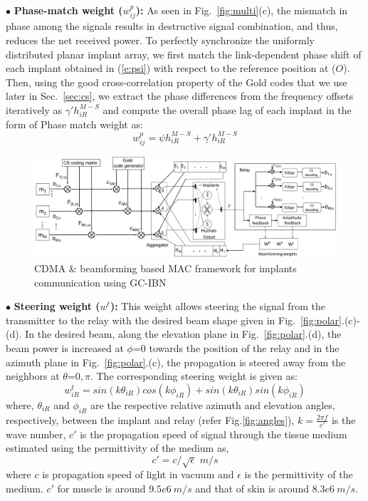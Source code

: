 \noindent$\bullet$ \textbf{Phase-match weight ($w_{ij}^p$):} As seen in Fig.~\ref{fig:multi}(c), the mismatch in phase among the signals results in destructive signal combination, and thus, reduces the net received power. To perfectly synchronize the uniformly distributed planar implant array, we first match the link-dependent phase shift of each implant obtained in (\ref{e:psi}) with respect to the reference position at ($O$). Then, using the good cross-correlation property of the Gold codes that we use later in Sec.~\ref{sec:cs}, we extract the phase differences from the frequency offsets iteratively as $\gamma' h_{iR}^{M-S}$ and compute the overall phase lag of each implant in the form of Phase match weight as: 
\begin{equation}\label{e:wp}
w_{ij}^p=\psi h_{iR}^{M-S}+\gamma' h_{iR}^{M-S} 
\end{equation}

 \begin{figure}[t]
	\centering
	\includegraphics[width=17cm]{figures/GC_beamforming/blockDiag.pdf} 
	\caption{\label{fig:spreading} CDMA \& beamforming based MAC framework for implants communication using GC-IBN}
\end{figure}

\noindent$\bullet$ \textbf{Steering weight ($w^t$):}
This weight allows steering the signal from the transmitter to the relay with the desired beam shape given in Fig.~\ref{fig:polar}.(c)-(d). In the desired beam, along the elevation plane in Fig.~\ref{fig:polar}.(d), the beam power is increased at $\phi$=$0$ towards the position of the relay and in the azimuth plane in Fig.~\ref{fig:polar}.(c), the propagation is steered away from the neighbors at $\theta$=$0,\pi$. The corresponding steering weight is given as: 
\begin{equation} \label{e:wt}
w^{t}_{iR}= sin(k\theta_{iR})cos(k\phi_{iR})+sin(k\theta_{iR})sin(k\phi_{iR})
\end{equation}
where, $\theta_{iR}$ and $\phi_{iR}$ are the respective relative azimuth and elevation angles, respectively, between the implant and relay (refer Fig.\ref{fig:angles}), $k=\frac{2\pi f}{c'}$ is the wave number, $c'$ is the propagation speed of signal through the tissue medium estimated using the permittivity of the medium as,
\begin{equation}
c' = c/\sqrt{\epsilon}\,\, m/s
\end{equation}
where $c$ is propagation speed of light in vacuum and $\epsilon$ is the permittivity of the medium. $c'$ for muscle is around $9.5e6\ m/s$ and that of skin is around $8.3e6\ m/s$.

